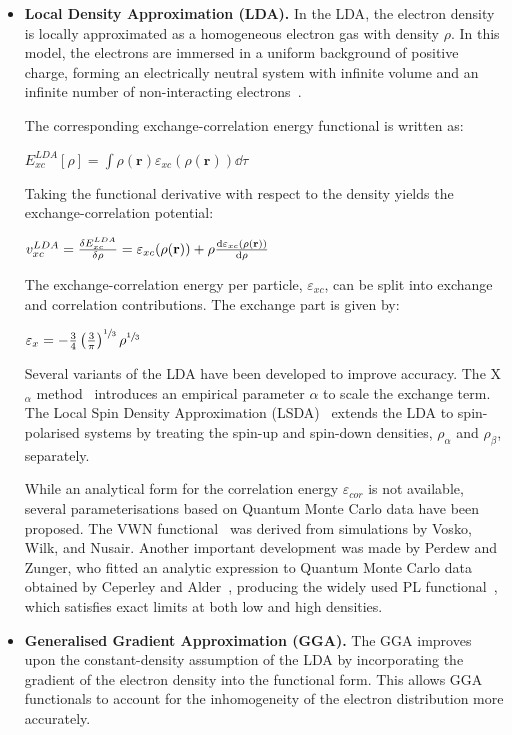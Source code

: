 \newpage
\begin{itemize}

  \item \textbf{Local Density Approximation (LDA).} In the \gls{LDA}, the
  electron density is locally approximated as a homogeneous electron gas with
  density $\rho$. In this model, the electrons are immersed in a uniform
  background of positive charge, forming an electrically neutral system with
  infinite volume and an infinite number of non-interacting
  electrons~\cite{Koch2001}.

  The corresponding exchange-correlation energy functional is written as:

  $E_{xc}^{LDA}[\rho] = \int\rho(\mathbf{r}) \varepsilon_{xc}(\rho(\mathbf{r}))\dd\tau$

  Taking the functional derivative with respect to the density yields the
  exchange-correlation potential:

  $v_{xc}^{LDA} = \fdv{E_{xc}^{LDA}}{\rho} = \varepsilon_{xc}(\rho(\mathbf{r}))
  + \rho \dv{\varepsilon_{xc}(\rho(\mathbf{r}))}{\rho}$

  The exchange-correlation energy per particle, $\varepsilon_{xc}$, can be split
  into exchange and correlation contributions. The exchange part is given by:

  $\varepsilon_{x} = -\frac34 \left(\frac3\pi\right)^{\sfrac{1}{3}}\rho^{\sfrac{1}{3}}$ 

  Several variants of the \gls{LDA} have been developed to improve accuracy. The
  X$_\alpha$ method~\cite{Slater74} introduces an empirical parameter $\alpha$ to
  scale the exchange term. The Local Spin Density Approximation
  (LSDA)~\cite{Slater74} extends the LDA to spin-polarised systems by treating
  the spin-up and spin-down densities, $\rho_\alpha$ and $\rho_\beta$, separately.

  While an analytical form for the correlation energy $\varepsilon_{cor}$ is not
  available, several parameterisations based on Quantum Monte Carlo data have
  been proposed. The VWN functional~\cite{Vosko1980} was derived from simulations
  by Vosko, Wilk, and Nusair. Another important development was made by Perdew and
  Zunger, who fitted an analytic expression to Quantum Monte Carlo data obtained
  by Ceperley and Alder~\cite{Ceperley1980}, producing the widely used PL
  functional~\cite{Perdew1981}, which satisfies exact limits at both low and high
  densities.

  \newpage
  \item \textbf{Generalised Gradient Approximation (GGA).} The \gls{GGA} improves
  upon the constant-density assumption of the LDA by incorporating the gradient
  of the electron density into the functional form. This allows GGA functionals to
  account for the inhomogeneity of the electron distribution more accurately.


\end{itemize}
